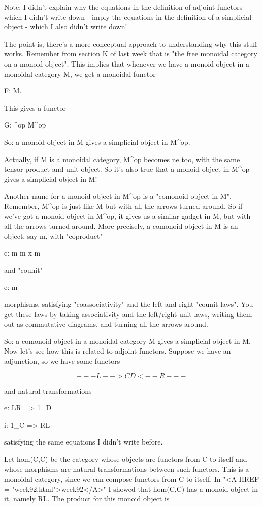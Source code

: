 Note: I didn't explain why the equations in the definition of adjoint
functors - which I didn't write down - imply the equations in the
definition of a simplicial object - which I also didn't write down!

The point is, there's a more conceptual approach to understanding why
this stuff works.  Remember from section K of last week that \Delta  is
"the free monoidal category on a monoid object".  This implies that
whenever we have a monoid object in a monoidal category M, we get a
monoidal functor

F: \Delta  \to  M.

This gives a functor

G: \Delta ^{op} \to  M^{op}

So: a monoid object in M gives a simplicial object in M^{op}.  

Actually, if M is a monoidal category, M^{op} becomes ne too, with the
same tensor product and unit object.  So it's also true that a monoid
object in M^{op} gives a simplicial object in M!

Another name for a monoid object in M^{op} is a "comonoid object in M".
Remember, M^{op} is just like M but with all the arrows turned around.
So if we've got a monoid object in M^{op}, it gives us a similar gadget
in M, but with all the arrows turned around.  More precisely, a comonoid
object in M is an object, say m, with "coproduct"

c: m \to  m x m

and "counit"

e: m 

morphisms, satisfying "coassociativity" and the left and right "counit
laws".  You get these laws by taking associativity and the left/right
unit laws, writing them out as commutative diagrams, and turning all the
arrows around.

So: a comonoid object in a monoidal category M gives a simplicial object
in M.  Now let's see how this is related to adjoint functors.  Suppose
we have an adjunction, so we have some functors

$$
  ---L-->
C         D
  <--R---
$$
    
and natural transformations

e: LR => 1_{D}

i: 1_{C} => RL

satisfying the same equations I didn't write before.  

Let hom(C,C) be the category whose objects are functors from C to
itself and whose morphisms are natural transformations between such
functors.  This is a monoidal category, since we can compose functors
from C to itself.  In "<A HREF = "week92.html">week92</A>" I showed that hom(C,C) has a monoid
object in it, namely RL.  The product for this monoid object is

